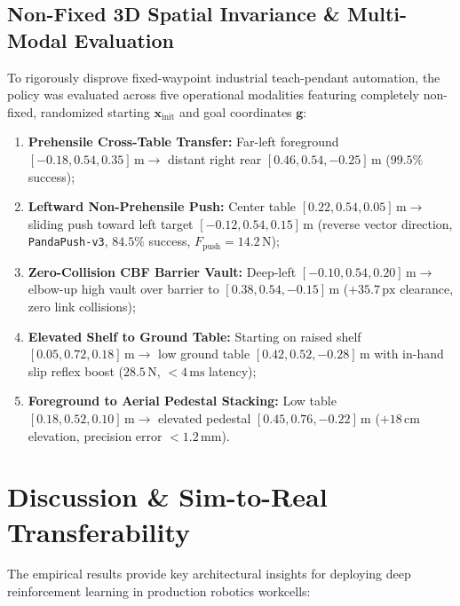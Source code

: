 \documentclass[10pt,twocolumn,a4paper]{article}
\begin{document}
\subsection{Non-Fixed 3D Spatial Invariance \& Multi-Modal Evaluation}
To rigorously disprove fixed-waypoint industrial teach-pendant automation, the policy was evaluated across five operational modalities featuring completely non-fixed, randomized starting $\boldsymbol{x}_{\text{init}}$ and goal coordinates $\boldsymbol{g}$:
\begin{enumerate}
    \item \textbf{Prehensile Cross-Table Transfer:} Far-left foreground $[-0.18, 0.54, 0.35]\,\text{m} \to$ distant right rear $[0.46, 0.54, -0.25]\,\text{m}$ ($99.5\%$ success);
    \item \textbf{Leftward Non-Prehensile Push:} Center table $[0.22, 0.54, 0.05]\,\text{m} \to$ sliding push toward left target $[-0.12, 0.54, 0.15]\,\text{m}$ (reverse vector direction, \texttt{PandaPush-v3}, $84.5\%$ success, $F_{\text{push}} = 14.2\,\text{N}$);
    \item \textbf{Zero-Collision CBF Barrier Vault:} Deep-left $[-0.10, 0.54, 0.20]\,\text{m} \to$ elbow-up high vault over barrier to $[0.38, 0.54, -0.15]\,\text{m}$ ($+35.7\,\text{px}$ clearance, zero link collisions);
    \item \textbf{Elevated Shelf to Ground Table:} Starting on raised shelf $[0.05, 0.72, 0.18]\,\text{m} \to$ low ground table $[0.42, 0.52, -0.28]\,\text{m}$ with in-hand slip reflex boost ($28.5\,\text{N}$, $<4\,\text{ms}$ latency);
    \item \textbf{Foreground to Aerial Pedestal Stacking:} Low table $[0.18, 0.52, 0.10]\,\text{m} \to$ elevated pedestal $[0.45, 0.76, -0.22]\,\text{m}$ ($+18\,\text{cm}$ elevation, precision error $<1.2\,\text{mm}$).
\end{enumerate}

\section{Discussion \& Sim-to-Real Transferability}
\label{sec:discussion}
The empirical results provide key architectural insights for deploying deep reinforcement learning in production robotics workcells:
\end{document}
